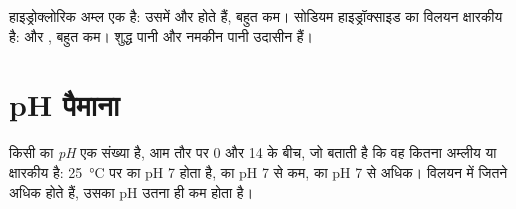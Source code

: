 \begin{example}[तीन विलयन]\label{ex:g9:acids-bases-ph:three}
हाइड्रोक्लोरिक अम्ल एक  है: उसमें  और
  होते हैं,  बहुत कम। सोडियम हाइड्रॉक्साइड का विलयन
क्षारकीय है:  और ,  बहुत कम। शुद्ध
पानी और नमकीन पानी उदासीन हैं।
\end{example}

\section{pH पैमाना}

\begin{definition}[pH]\label{def:g9:acids-bases-ph:ph}
किसी  का \emph{pH} एक संख्या है, आम तौर पर
0 और 14 के बीच, जो बताती है कि वह कितना अम्लीय या क्षारकीय है:
\qty{25}{\celsius} पर  का pH 7 होता है,  का pH
7 से कम,  का pH 7 से अधिक। विलयन में जितने अधिक  
होते हैं, उसका pH उतना ही कम होता है।
\end{definition}

